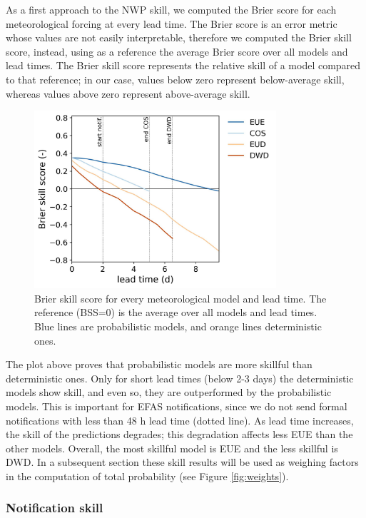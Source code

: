 \documentclass[preprint,12pt]{elsarticle}
\begin{document}
As a first approach to the NWP skill, we computed the Brier score for each meteorological forcing at every lead time. The Brier score is an error metric whose values are not easily interpretable, therefore we computed the Brier skill score, instead, using as a reference the average Brier score over all models and lead times. The Brier skill score represents the relative skill of a model compared to that reference; in our case, values below zero represent below-average skill, whereas values above zero represent above-average skill.

\begin{figure}
    \centering
    \includegraphics[width=0.8\textwidth]{figures/Brier_skill_score_5.jpg}
    \caption{Brier skill score for every meteorological model and lead time. The reference (BSS=0) is the average over all models and lead times. Blue lines are probabilistic models, and orange lines deterministic ones.}
    \label{fig:brier_score}
\end{figure}

The plot above proves that probabilistic models are more skillful than deterministic ones. Only for short lead times (below 2-3 days) the deterministic models show skill, and even so, they are outperformed by the probabilistic models. This is important for EFAS notifications, since we do not send formal notifications with less than 48 h lead time (dotted line). As lead time increases, the skill of the predictions degrades; this degradation affects less EUE than the other models. Overall, the most skillful model is EUE and the less skillful is DWD. In a subsequent section these skill results will be used as weighing factors in the computation of total probability (see Figure \ref{fig:weights}).

\subsubsection{Notification skill}
\end{document}
